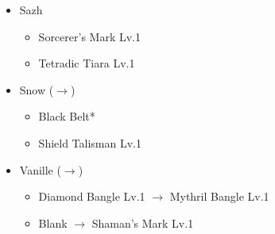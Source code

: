 \begin{menu}
\begin{itemize}
\begin{itemize}
\begin{itemize}
				\end{itemize}							      	
		\end{itemize}
		\equip
		\begin{itemize}
			\item Sazh
				\begin{itemize}
					\item Sorcerer's Mark Lv.1
					\item Tetradic Tiara Lv.1
				\end{itemize}
			\item Snow ($\rightarrow$)
				\begin{itemize}
					\item Black Belt*
					\item Shield Talisman Lv.1
				\end{itemize}
			\item Vanille ($\rightarrow$)
				\begin{itemize}
					\item Diamond Bangle Lv.1 $\rightarrow$ Mythril Bangle Lv.1
					\item Blank $\rightarrow$ Shaman's Mark Lv.1
				\end{itemize}
		\end{itemize}
	\end{itemize}
\end{menu}
